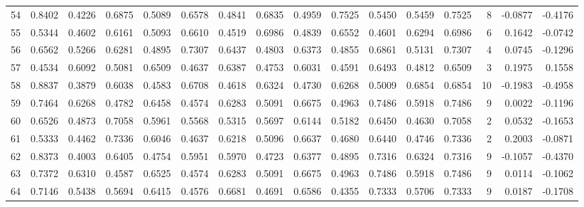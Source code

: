 \begin{tabular}{lrrrrrrrrrrrrrrr}
54  &      0.8402 &  0.4226 &  0.6875 &  0.5089 &  0.6578 &  0.4841 &  0.6835 &  0.4959 &  0.7525 &  0.5450 &   0.5459 &     0.7525 &      8 &                   -0.0877 &                    -0.4176 \\
55  &      0.5344 &  0.4602 &  0.6161 &  0.5093 &  0.6610 &  0.4519 &  0.6986 &  0.4839 &  0.6552 &  0.4601 &   0.6294 &     0.6986 &      6 &                    0.1642 &                    -0.0742 \\
56  &      0.6562 &  0.5266 &  0.6281 &  0.4895 &  0.7307 &  0.6437 &  0.4803 &  0.6373 &  0.4855 &  0.6861 &   0.5131 &     0.7307 &      4 &                    0.0745 &                    -0.1296 \\
57  &      0.4534 &  0.6092 &  0.5081 &  0.6509 &  0.4637 &  0.6387 &  0.4753 &  0.6031 &  0.4591 &  0.6493 &   0.4812 &     0.6509 &      3 &                    0.1975 &                     0.1558 \\
58  &      0.8837 &  0.3879 &  0.6038 &  0.4583 &  0.6708 &  0.4618 &  0.6324 &  0.4730 &  0.6268 &  0.5009 &   0.6854 &     0.6854 &     10 &                   -0.1983 &                    -0.4958 \\
59  &      0.7464 &  0.6268 &  0.4782 &  0.6458 &  0.4574 &  0.6283 &  0.5091 &  0.6675 &  0.4963 &  0.7486 &   0.5918 &     0.7486 &      9 &                    0.0022 &                    -0.1196 \\
60  &      0.6526 &  0.4873 &  0.7058 &  0.5961 &  0.5568 &  0.5315 &  0.5697 &  0.6144 &  0.5182 &  0.6450 &   0.4630 &     0.7058 &      2 &                    0.0532 &                    -0.1653 \\
61  &      0.5333 &  0.4462 &  0.7336 &  0.6046 &  0.4637 &  0.6218 &  0.5096 &  0.6637 &  0.4680 &  0.6440 &   0.4746 &     0.7336 &      2 &                    0.2003 &                    -0.0871 \\
62  &      0.8373 &  0.4003 &  0.6405 &  0.4754 &  0.5951 &  0.5970 &  0.4723 &  0.6377 &  0.4895 &  0.7316 &   0.6324 &     0.7316 &      9 &                   -0.1057 &                    -0.4370 \\
63  &      0.7372 &  0.6310 &  0.4587 &  0.6525 &  0.4574 &  0.6283 &  0.5091 &  0.6675 &  0.4963 &  0.7486 &   0.5918 &     0.7486 &      9 &                    0.0114 &                    -0.1062 \\
64  &      0.7146 &  0.5438 &  0.5694 &  0.6415 &  0.4576 &  0.6681 &  0.4691 &  0.6586 &  0.4355 &  0.7333 &   0.5706 &     0.7333 &      9 &                    0.0187 &                    -0.1708 \\

\end{tabular}
